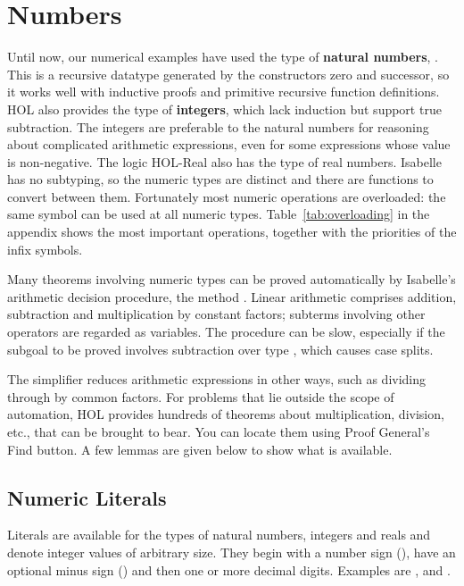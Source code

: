 
\section{Numbers}
\label{sec:numbers}

%
Until now, our numerical examples have used the type of \textbf{natural
numbers},
.  This is a recursive datatype generated by the constructors
zero  and successor, so it works well with inductive proofs and primitive
recursive function definitions.  HOL also provides the type
 of \textbf{integers}, which lack induction but support true
subtraction.  The integers are preferable to the natural numbers for reasoning about
complicated arithmetic expressions, even for some expressions whose
value is non-negative.  The logic HOL-Real also has the type
 of real numbers.  Isabelle has no subtyping,  so the numeric
types are distinct and there are  functions to convert between them.
Fortunately most numeric operations are overloaded: the same symbol can be
used at all numeric types. Table~\ref{tab:overloading} in the appendix
shows the most important operations, together with the priorities of the
infix symbols.

%
Many theorems involving numeric types can be proved automatically by
Isabelle's arithmetic decision procedure, the method
.  Linear arithmetic comprises addition, subtraction
and multiplication by constant factors; subterms involving other operators
are regarded as variables.  The procedure can be slow, especially if the
subgoal to be proved involves subtraction over type , which 
causes case splits.  

The simplifier reduces arithmetic expressions in other
ways, such as dividing through by common factors.  For problems that lie
outside the scope of automation, HOL provides hundreds of
theorems about multiplication, division, etc., that can be brought to
bear.  You can locate them using Proof General's Find
button.  A few lemmas are given below to show what
is available.

\subsection{Numeric Literals}
\label{sec:numerals}

%
Literals are available for the types of natural numbers, integers 
and reals and denote integer values of arbitrary size. 
They begin 
with a number sign (\isa{\#}), have an optional minus sign (\isa{-}) and 
then one or more decimal digits. Examples are ,  
and .

